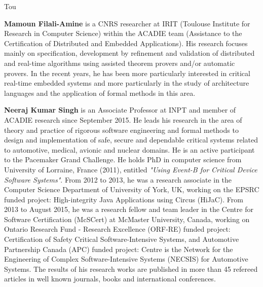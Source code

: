 \begin{sitedescription}{Tou}
\begin{compactitem}
\item{\bf  Mamoun Filali-Amine}  is a CNRS researcher at IRIT (Toulouse Institute for Research in Computer Science)
within the ACADIE team (Assistance to the Certification of Distributed and Embedded Applications).
His research focuses mainly on specification, development by refinement and validation of distributed and real-time algorithms using  assisted theorem provers and/or automatic provers. In the recent years, he has been more particularly interested in critical real-time embedded systems and more particularly in the study of architecture languages and the application of formal methods in this area.

\item{\bf   Neeraj Kumar Singh} is an Associate Professor at INPT and member of  ACADIE research since September 2015. He leads his research in the area of theory and practice of rigorous software engineering and formal methods to design and implementation of safe, secure and dependable critical systems related to automotive, medical, avionic and nuclear domains. He is an active participant to the Pacemaker Grand Challenge. He holds PhD in computer science from University of Lorraine, France (2011), entitled  \textit{"Using Event-B for Critical Device Software Systems"}. From  2012 to  2013, he was a research associate in the Computer Science Department of University of York, UK, working on the  EPSRC funded project: High-integrity Java Applications using Circus (HiJaC). From 2013 to August 2015, he was a research fellow and team leader in the Centre for Software Certification (McSCert) at McMaster University, Canada, working on Ontario Research Fund - Research Excellence (ORF-RE) funded project: Certification of Safety Critical Software-Intensive Systems, and Automotive Partnership Canada (APC) funded project: Centre is the Network for the Engineering of Complex Software-Intensive Systems (NECSIS) for Automotive Systems.  The results of his research works are published in more than 45 refereed articles in well known journals, books and international conferences.

\end{compactitem}

\end{sitedescription}


